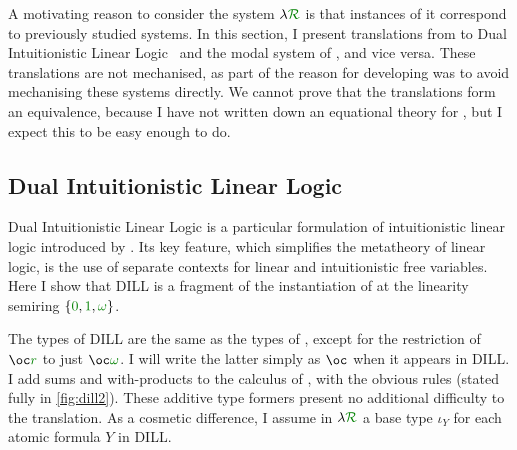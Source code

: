 \newcommand\instDILL{\gr{01\omega}}
\newcommand\instPD{\gr{01\Box}}

\newcommand\unused{\gr0}
\newcommand\true{\gr1}
\newcommand\valid{\gr\Box}

A motivating reason to consider the system $\name$ is that
instances of it correspond to previously studied systems.
In this section, I present translations from \name{} to Dual Intuitionistic
Linear Logic~\citep{Barber1996} and the modal system of \citet{judgmental},
and vice versa.
These translations are not mechanised, as part of the reason for developing
\name{} was to avoid mechanising these systems directly.
We cannot prove that the translations form an equivalence, because I have not
written down an equational theory for \name{}, but I expect this to be easy
enough to do.

\subsection{Dual Intuitionistic Linear Logic}\label{sec:trans-dill}

Dual Intuitionistic Linear Logic is a particular formulation of intuitionistic
linear logic introduced by \citet{Barber1996}.
Its key feature, which simplifies the metatheory of linear logic, is the use of
separate contexts for linear and intuitionistic free variables.
Here I show that DILL is a fragment of the instantiation of \name{} at the
linearity semiring $\{\gr0, \gr1, \gr\omega\}$.

The types of DILL are the same as the types of \name, except for the
restriction of $\oc\gr{r}$ to just $\oc\gr\omega$.
I will write the latter simply as $\oc$ when it appears in DILL\@.
I add sums and with-products to the calculus of \citet{Barber1996}, with the
obvious rules (stated fully in \cref{fig:dill2}).
These additive type formers present no additional difficulty to the translation.
As a cosmetic difference, I assume in $\name$ a base type $\iota_Y$ for each
atomic formula $Y$ in DILL.


